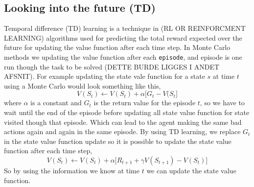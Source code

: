 \documentclass[11pt]{article}
\begin{document}
\subsection{Looking into the future (TD)}

Temporal difference (TD) learning is a technique in (RL OR REINFORCMENT LEARNING) algorithms used for predicting the total reward expected over the future for updating the value function after each time step. In Monte Carlo methods we updating the value function after each \texttt{episode}, and episode is one run though the task to be solved (DETTE BURDE LIGGES I ANDET AFSNIT). For example updating the state vale function for a state $s$ at time $t$ using a Monte Carlo would look something like this,
\begin{equation}
    V(S_{t}) \leftarrow V(S_{t}) + \alpha \big[G_{t} - V(S_{t} \big]
\end{equation}
where $\alpha$ is a constant and $G_{t}$ is the return value for the episode $t$, so we have to wait until the end of the episode before updating all state value function for state visited though that episode. Which can lead to the agent making the same bad actions again and again in the same episode. By using TD learning, we replace $G_{t}$ in the state value function update so it is possible to update the state value function after each time step,
\begin{equation}
    V(S_{t}) \leftarrow V(S_{t}) + \alpha \big[R_{t + 1} + \gamma V(S_{t + 1}) - V(S_{t}) \big]
\end{equation}
So by using the information we know at time $t$ we can update the state value function.




%
%
\end{document}
